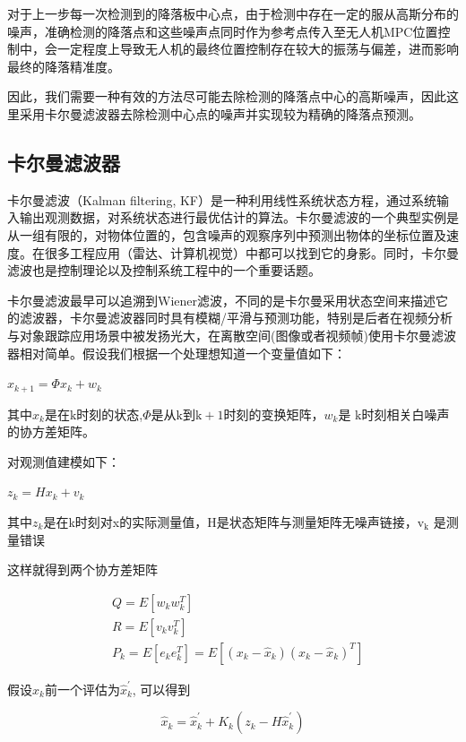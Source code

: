 对于上一步每一次检测到的降落板中心点，由于检测中存在一定的服从高斯分布的噪声，准确检测的降落点和这些噪声点同时作为参考点传入至无人机MPC位置控制中，会一定程度上导致无人机的最终位置控制存在较大的振荡与偏差，进而影响最终的降落精准度。

因此，我们需要一种有效的方法尽可能去除检测的降落点中心的高斯噪声，因此这里采用卡尔曼滤波器去除检测中心点的噪声并实现较为精确的降落点预测。

\subsection{卡尔曼滤波器}

卡尔曼滤波（Kalman filtering, KF）是一种利用线性系统状态方程，通过系统输入输出观测数据，对系统状态进行最优估计的算法。卡尔曼滤波的一个典型实例是从一组有限的，对物体位置的，包含噪声的观察序列中预测出物体的坐标位置及速度。在很多工程应用（雷达、计算机视觉）中都可以找到它的身影。同时，卡尔曼滤波也是控制理论以及控制系统工程中的一个重要话题。

卡尔曼滤波最早可以追溯到Wiener滤波，不同的是卡尔曼采用状态空间来描述它的滤波器，卡尔曼滤波器同时具有模糊/平滑与预测功能，特别是后者在视频分析与对象跟踪应用场景中被发扬光大，在离散空间(图像或者视频帧)使用卡尔曼滤波器相对简单。假设我们根据一个处理想知道一个变量值如下：

$x_{k+1}=\Phi x_{k}+w_{k}$

其中$x_{k}$是在$\mathrm{k}$时刻的状态,$\Phi$是从$\mathrm{k}$到$\mathrm{k}+1$时刻的变换矩阵，$w_{k}$是 $\mathrm{k}$时刻相关白噪声的协方差矩阵。

对观测值建模如下：

$z_{k}=H x_{k}+v_{k}$

其中$z_{k}$是在k时刻对x的实际测量值，$\mathrm{H}$是状态矩阵与测量矩阵无噪声链接，$\mathrm{v}_{\mathrm{k}}$ 是测量错误

这样就得到两个协方差矩阵

$$
\begin{aligned}
&Q=E\left[w_{k} w_{k}^{T}\right] \\
&R=E\left[v_{k} v_{k}^{T}\right] \\
&P_{k}=E\left[e_{k} e_{k}^{T}\right]=E\left[\left(x_{k}-\hat{x}_{k}\right)\left(x_{k}-\hat{x}_{k}\right)^{T}\right]
\end{aligned}
$$

假设$\hat{x}_{k}$前一个评估为$\hat{x}_{k}^{\prime}$, 可以得到

$$
\hat{x}_{k}=\hat{x}_{k}^{\prime}+K_{k}\left(z_{k}-H \hat{x}_{k}^{\prime}\right)
$$

